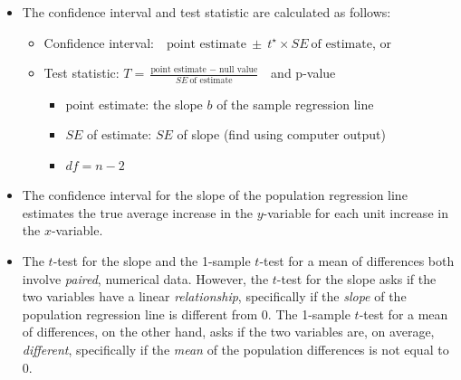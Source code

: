 \begin{itemize}
\begin{itemize}
\end{itemize}
\item The confidence interval and test statistic are calculated as follows:   
\begin{itemize}
\item[] Confidence interval:\ \  $\text{point estimate}\ \pm\ t^{\star} \times SE\ \text{of estimate}$, or
\item[] Test statistic:  $T = \frac{\text{point estimate } - \text{ null value}}{SE\ \text{of estimate}}$ \ and p-value
\begin{itemize}
\item[] point estimate:  the slope $b$ of the sample regression line
\item[] $SE$ of estimate:  $SE$ of slope (find using computer output)
\item[] $df = n-2$
\end{itemize}
\end{itemize}


\item The confidence interval for the slope of the population regression line estimates the true average increase in the $y$-variable for each unit increase in the $x$-variable.

\item The $t$-test for the slope and the 1-sample $t$-test for a mean of differences both involve \emph{paired}, numerical data.  However, the $t$-test for the slope asks if the two variables have a linear \emph{relationship}, specifically if the \emph{slope} of the population regression line is different from 0.  The 1-sample $t$-test for a mean of differences, on the other hand, asks if the two variables are, on average, \emph{different}, specifically if the \emph{mean} of the population differences is not equal to 0.  
\end{itemize}

{}



\reviewchapterheader{}

